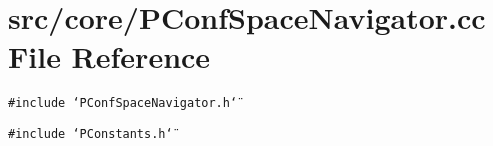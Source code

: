 \section{src/core/PConf\-Space\-Navigator.cc File Reference}
\label{PConfSpaceNavigator_8cc}


{\tt \#include \char`\"{}PConf\-Space\-Navigator.h\char`\"{}}\par
{\tt \#include \char`\"{}PConstants.h\char`\"{}}\par
